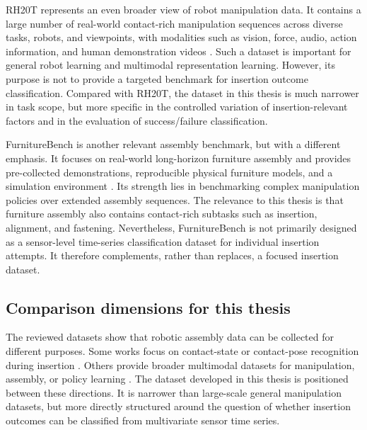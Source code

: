 RH20T represents an even broader view of robot manipulation data. It contains a large number of real-world contact-rich manipulation sequences across diverse tasks, robots, and viewpoints, with modalities such as vision, force, audio, action information, and human demonstration videos \cite{fangRH20TComprehensiveRobotic2024}. Such a dataset is important for general robot learning and multimodal representation learning. However, its purpose is not to provide a targeted benchmark for insertion outcome classification. Compared with RH20T, the dataset in this thesis is much narrower in task scope, but more specific in the controlled variation of insertion-relevant factors and in the evaluation of success/failure classification.

FurnitureBench is another relevant assembly benchmark, but with a different emphasis. It focuses on real-world long-horizon furniture assembly and provides pre-collected demonstrations, reproducible physical furniture models, and a simulation environment \cite{heoFurnitureBenchReproducibleRealworld2025a}. Its strength lies in benchmarking complex manipulation policies over extended assembly sequences. The relevance to this thesis is that furniture assembly also contains contact-rich subtasks such as insertion, alignment, and fastening. Nevertheless, FurnitureBench is not primarily designed as a sensor-level time-series classification dataset for individual insertion attempts. It therefore complements, rather than replaces, a focused insertion dataset.

\subsection{Comparison dimensions for this thesis}

The reviewed datasets show that robotic assembly data can be collected for different purposes. Some works focus on contact-state or contact-pose recognition during insertion \cite{jasimContactstateMonitoringForceguided2014,jinContactPoseIdentification2021a}. Others provide broader multimodal datasets for manipulation, assembly, or policy learning \cite{sliwowskiREASSEMBLEMultimodalDataset2025,fangRH20TComprehensiveRobotic2024,heoFurnitureBenchReproducibleRealworld2025a}. The dataset developed in this thesis is positioned between these directions. It is narrower than large-scale general manipulation datasets, but more directly structured around the question of whether insertion outcomes can be classified from multivariate sensor time series.

